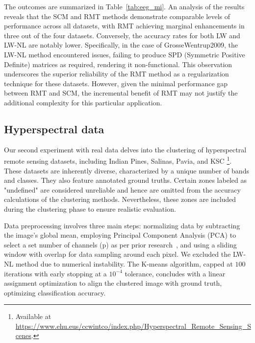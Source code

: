 \documentclass{article}
\theoremstyle{plain}
\theoremstyle{definition}
\theoremstyle{remark}
\begin{document}

The outcomes are summarized in Table~\ref{tab:eeg_mi}. An analysis of the results reveals that the SCM and RMT methods demonstrate comparable levels of performance across all datasets, with RMT achieving marginal enhancements in three out of the four datasets. Conversely, the accuracy rates for both LW and LW-NL are notably lower. Specifically, in the case of GrosseWentrup2009, the LW-NL method encountered issues, failing to produce SPD (Symmetric Positive Definite) matrices as required, rendering it non-functional. This observation underscores the superior reliability of the RMT method as a regularization technique for these datasets. However, given the minimal performance gap between RMT and SCM, the incremental benefit of RMT may not justify the additional complexity for this particular application.

\subsection{Hyperspectral data}





Our second experiment with real data delves into the clustering of hyperspectral remote sensing datasets, including Indian Pines, Salinas, Pavia, and KSC%
\footnote{
    Available at \url{https://www.ehu.eus/ccwintco/index.php/Hyperspectral_Remote_Sensing_Scenes}.
}.
 These datasets are inherently diverse, characterized by a unique number of bands and classes. They also feature annotated ground truths. Certain zones labeled as "undefined" are considered unreliable and hence are omitted from the accuracy calculations of the clustering methods. Nevertheless, these zones are included during the clustering phase to ensure realistic evaluation. 

 Data preprocessing involves three main steps: normalizing data by subtracting the image's global mean, employing Principal Component Analysis (PCA) to select a set number of channels (p) as per prior research~\cite{9627641}, and using a sliding window with overlap for data sampling around each pixel. We excluded the LW-NL method due to numerical instability. The K-means algorithm, capped at $100$ iterations with early stopping at a $10^{-4}$ tolerance, concludes with a linear assignment optimization to align the clustered image with ground truth, optimizing classification accuracy.
 
\end{document}
